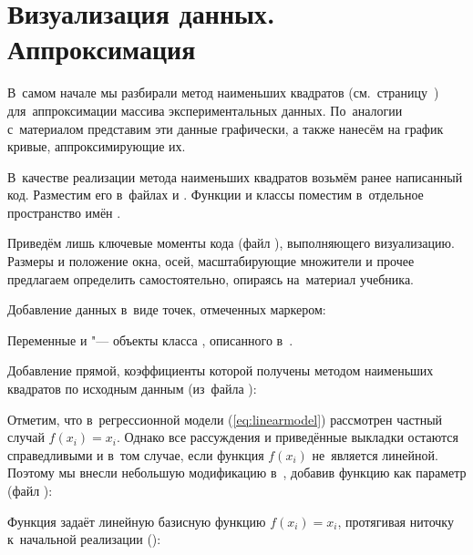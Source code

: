 



\section{Визуализация данных. Аппроксимация}
В~самом начале мы разбирали метод наименьших квадратов (см.~страницу~\pageref{sect:leastsquares}) для~аппроксимации массива экспериментальных данных. По~аналогии с~материалом  представим эти данные графически, а также нанесём на график кривые, аппроксимирующие их.

В~качестве реализации метода наименьших квадратов возьмём ранее написанный код. Разместим его в~файлах  и . Функции и классы поместим в~отдельное пространство имён .

Приведём лишь ключевые моменты кода (файл ), выполняющего визуализацию. Размеры и положение окна, осей, масштабирующие множители и прочее предлагаем определить самостоятельно, опираясь на~материал учебника.

Добавление данных в~виде точек, отмеченных маркером:


\noindent Переменные  и  "--- объекты класса , описанного в~.

Добавление прямой, коэффициенты которой получены методом наименьших квадратов по исходным данным (из~файла ):


Отметим, что в~регрессионной модели (\ref{eq:linearmodel}) рассмотрен частный случай \(f(x_i) = x_i\). Однако все рассуждения и приведённые выкладки остаются справедливыми и в~том случае, если функция \(f(x_i)\) не~является линейной. Поэтому мы внесли небольшую модификацию в~, добавив функцию как параметр (файл ):


Функция  задаёт линейную базисную функцию \(f(x_i) = x_i\), протягивая ниточку к~начальной реализации ():

